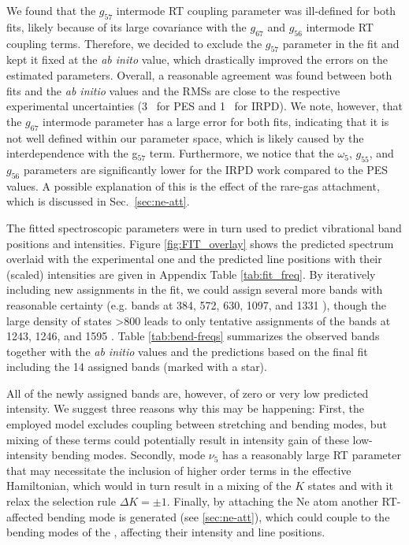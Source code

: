 We found that the $g_{57}$ intermode RT coupling parameter was ill-defined for both fits, likely because of its large covariance with the $g_{67}$ and $g_{56}$ intermode RT coupling terms. Therefore, we decided to exclude the $g_{57}$ parameter in the fit and kept it fixed at the \emph{ab inito} value, which drastically improved the errors on the estimated parameters. Overall, a reasonable agreement was found between both fits and the \emph{ab initio} values and the RMSs are close to the respective experimental uncertainties (3 \wn\ for PES and 1 \wn\ for IRPD). We note, however, that the $g_{67}$ intermode parameter has a large error for both fits, indicating that it is not well defined within our parameter space, which is likely caused by the interdependence with the g$_{57}$ term. Furthermore, we notice that the $\omega_5$, $g_{55}$, and $g_{56}$ parameters are significantly lower for the IRPD work compared to the PES values. A possible explanation of this is the effect of the rare-gas attachment, which is discussed in Sec.~\ref{sec:ne-att}.

The fitted spectroscopic parameters were in turn used to predict vibrational band positions and intensities. Figure \ref{fig:FIT_overlay} shows the predicted spectrum overlaid with the experimental one and the predicted line positions with their (scaled) intensities are given in Appendix  Table \ref{tab:fit_freq}. 
By iteratively including new assignments in the fit, we could assign several more bands with reasonable certainty (e.g. bands at 384, 572, 630, 1097, and 1331 \wn), though the large density of states >800 \wns leads to only tentative assignments of the bands at 1243, 1246, and 1595 \wn.
Table \ref{tab:bend-freqs} summarizes the observed bands together with the \emph{ab initio} values and the predictions based on the final fit including the 14 assigned bands (marked with a star).

All of the newly assigned bands are, however, of zero or very low predicted intensity. We suggest three reasons why this may be happening: First, the employed model excludes coupling between stretching and bending modes, but mixing of these terms could potentially result in intensity gain of these low-intensity bending modes. Secondly, mode $\nu_5$ has a reasonably large RT parameter that may necessitate the inclusion of higher order terms in the effective Hamiltonian, which would in turn result in a mixing of the $K$ states and with it relax the selection rule $\Delta K=\pm1$. Finally, by attaching the Ne atom another RT-affected bending mode is generated (see \ref{sec:ne-att}), which could couple to the bending modes of the \ion, affecting their intensity and line positions.


